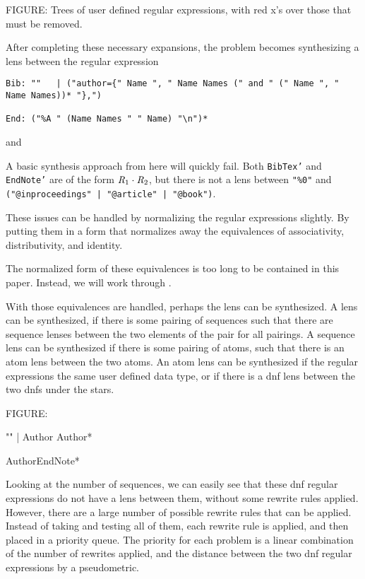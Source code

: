 FIGURE:
Trees of user defined regular expressions, with red x's over those that must be
removed.

After completing these necessary expansions, the problem becomes synthesizing a
lens between the regular expression
\begin{lstlisting}
Bib: ""   | ("author={" Name ", " Name Names (" and " (" Name ", " Name Names))* "},")

End: ("%A " (Name Names " " Name) "\n")*
\end{lstlisting}
and

A basic synthesis approach from here will quickly fail.  Both \texttt{BibTex'}
and \texttt{EndNote'} are of the form $\mathit{R}_1\cdot\mathit{R}_2$, but there is
not a lens between \texttt{"\%0"} and
\texttt{("@inproceedings" | "@article" | "@book")}.

These issues can be handled by normalizing the regular expressions slightly.
By putting them in a form that normalizes away the equivalences of
associativity, distributivity, and \EmptyString{} identity.

The normalized form of these equivalences is too long to be contained in this
paper.  Instead, we will work through .

With those equivalences are handled, perhaps the lens can be synthesized.
A lens can be synthesized, if there is some pairing of sequences such that
there are sequence lenses between the two elements of the pair for all pairings.
A sequence lens can be synthesized if there is some pairing of atoms, such that
there is an atom lens between the two atoms.  An atom lens can be synthesized
if the regular expressions the same user defined data type, or if there is a dnf
lens between the two dnfs under the stars.

FIGURE:

"" | Author Author*

AuthorEndNote*

Looking at the number of sequences, we can easily see that these dnf regular
expressions do not have a lens between them, without some rewrite rules applied.
However, there are a large number of possible rewrite rules that can be applied.
Instead of taking and testing all of them, each rewrite rule is applied, and
then placed in a priority queue.
The priority for each problem is a linear combination of the number of rewrites
applied, and the distance between the two dnf regular expressions by a
pseudometric.


